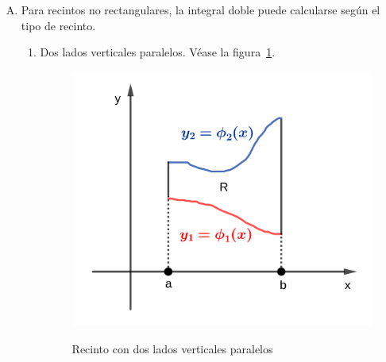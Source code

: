 \documentclass{article}
\renewcommand{\Bbb}{\mathbb}
\begin{document}
\begin{enumerate}[(A)]
\begin{equation}
\tcboxmath[colback=orange!25!white,colframe=orange, title=Teorema de Fubbini]
{
\begin{array}{ll}
\iint_R f(x,y) \mathop{dx} \mathop{dy} = \int_a^b \left( \int_c^d f(x,y) \mathop{dy} \right) \mathop{dx} \\
\iint_R f(x,y) \mathop{dx} \mathop{dy} = \int_c^d \left( \int_a^b f(x,y) \mathop{dx} \right) \mathop{dy}
\end{array}
}
\end{equation}

Lo que este teorema dice es que dadas sus condiciones, la integral doble puede resolverse integrando primero respecto a $x$ y luego $y$, o viceversa. El resultado debería ser el mismo.

¿Qué se entiende por \textbf{conjunto de contenido nulo}? En $\Bbb R^2$, es un recinto de área nula. En $\Bbb R$, un segmento de longitud nula. En $\Bbb R^3$, volumen nulo. Para mayores dimensiones, será un concepto extendido de tamaño de un recinto.

\item Para recintos no rectangulares, la integral doble puede calcularse según el tipo de recinto.

\begin{enumerate}
\item Dos lados verticales paralelos. Véase la figura~\ref{fig:d1}.

\begin{figure}[ht]
\centering
\caption{Recinto con dos lados verticales paralelos}
\includegraphics[scale=0.75]{img/teo_fig018_d1.png}
\label{fig:d1}
\end{figure}


\end{enumerate}
\end{enumerate}
\end{document}

